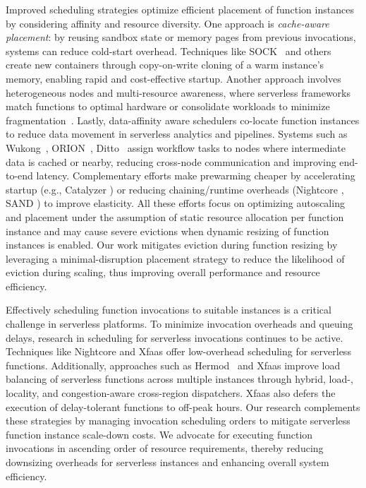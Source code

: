 Improved scheduling strategies optimize efficient placement of function instances
by considering affinity and resource diversity.
One approach is \emph{cache-aware placement}: by reusing sandbox state or memory
pages from previous invocations, systems can reduce cold-start overhead.
Techniques like SOCK~\cite{SOCK_OakesYZHHAA18} and others~\cite{li2022help}
create new containers through copy-on-write cloning of a warm instance’s memory,
enabling rapid and cost-effective startup.
Another approach involves heterogeneous nodes and multi-resource awareness, where
serverless frameworks match functions to optimal hardware or consolidate
workloads to minimize fragmentation~\cite{RoyPT22, DuLJXZC22}.
Lastly, data-affinity aware schedulers co-locate function instances to reduce
data movement in serverless analytics and pipelines.
Systems such as Wukong~\cite{Wukong_CarverZWAWC20}, ORION~\cite{ORION_MahgoubYSECB22}, Ditto~\cite{JinZXZHLJ23}
assign workflow tasks to nodes where intermediate data is cached or nearby,
reducing cross-node communication and improving end-to-end latency.
Complementary efforts make prewarming cheaper by accelerating startup (e.g., Catalyzer
\cite{Catalyzer_DuYXZYQWC20}) or reducing chaining/runtime overheads
(Nightcore \cite{jia2021nightcore}, SAND \cite{sand_AkkusCRSSBAH18}) to improve elasticity.
All these efforts focus on optimizing autoscaling and placement under the assumption
of static resource allocation per function instance and may cause severe evictions
when dynamic resizing of function instances is enabled.
Our work mitigates eviction during function resizing by leveraging a minimal-disruption
placement strategy to reduce the likelihood of eviction during scaling,
thus improving overall performance and resource efficiency.

Effectively scheduling function invocations to suitable instances
is a critical challenge in serverless platforms.
To minimize invocation overheads and queuing delays,
research in scheduling for serverless invocations continues to be active.
Techniques like Nightcore \cite{jia2021nightcore} and Xfaas \cite{sahraei2023xfaas}
offer low-overhead scheduling for serverless functions.
Additionally, approaches such as Hermod~\cite{SoCC22:Hermod} and Xfaas
improve load balancing of serverless functions across multiple instances
through hybrid, load-, locality, and congestion-aware cross-region dispatchers.
Xfaas also defers the execution of delay-tolerant functions to off-peak hours.
Our research complements these strategies by managing invocation scheduling orders
to mitigate serverless function instance scale-down costs.
We advocate for executing function invocations in ascending order of resource requirements,
thereby reducing downsizing overheads for serverless instances and enhancing overall system efficiency.
